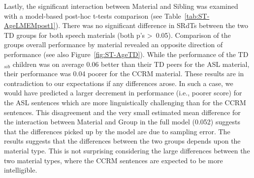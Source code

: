 \documentclass[a4paper, twoside]{templates/ociamthesis}
\begin{document}
Lastly, the significant interaction between Material and Sibling was examined with a model-based post-hoc t-tests comparison (see Table~\ref{tab:ST-AgeLMEMpost1}). There was no significant difference in SRdTs between the two TD groups for both speech materials (both p's \textgreater~0.05). Comparison of the groups overall performance by material revealed an opposite direction of performance (see also Figure~\ref{fig:ST-AgeTD}). While the performance of the TD\(_{sib}\) children was on average 0.06 better than their TD peers for the ASL material, their performance was 0.04 poorer for the CCRM material. These results are in contradiction to our expectations if any differences arose. In such a case, we would have predicted a larger decrement in performance (i.e., poorer score) for the ASL sentences which are more linguistically challenging than for the CCRM sentences. This disagreement and the very small estimated mean difference for the interaction between Material and Group in the full model (0.052) suggests that the differences picked up by the model are due to sampling error. The results suggests that the differences between the two groups depends upon the material type. This is not surprising considering the large differences between the two material types, where the CCRM sentences are expected to be more intelligible.\\



\begin{table}

\caption{\label{tab:ST-AgeLMEMpost1}ST: Age-effect: post-hoc paired-comparison t-tests for Material (ASL/CCRM) x Sibling (TD/TD\(_{sib}\)) interaction. The test was performed on the fitted LMEM model and included adjusted least-squared-mean for the random intercepts (subjects) using lsmeans package \autocite[emmeans package;][]{emmeansPackageR}.}
\centering
{}
\end{table}
\end{document}
